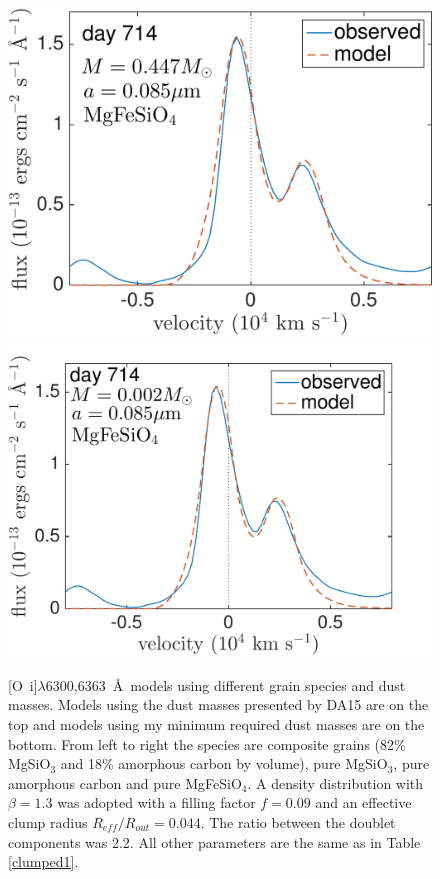 \begin{figure}
\includegraphics[trim =-25 0 0 0,clip=true,scale=0.33]{chapters/chapter5/images/silicates_take2/OI/MgFeSiO4_Dwek.pdf}
\hspace{3mm}
\includegraphics[trim =0 0 0 -25,clip=true,scale=0.33]{chapters/chapter5/images/silicates_take2/OI/MgFeSiO4_bestfit.pdf}

\caption{[O~{\sc i}]$\lambda$6300,6363~\AA\ models using different grain 
species and dust masses.  Models using the dust masses presented by DA15 
are on the top and models using my minimum required dust masses are on 
the bottom.  From left to right the species are composite grains (82\% 
MgSiO$_3$ and 18\% amorphous carbon by volume), pure MgSiO$_3$, pure 
amorphous carbon and pure MgFeSiO$_4$.  A density distribution with 
$\beta=1.3$ was adopted with a filling factor $f=0.09$ and an effective 
clump radius $R_{eff}/R_{out}=0.044$. The ratio between the 
doublet components was 2.2. All other parameters are the same as in 
Table \ref{clumped1}.}
\label{Dwek_models_OI}
\end{figure}

